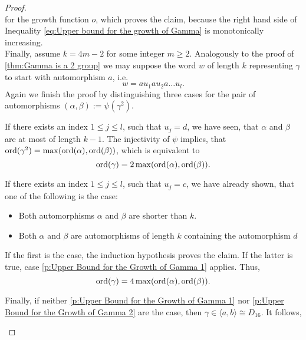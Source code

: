 \begin{proof}
\begin{equation}
\end{equation}
for the growth function $o$, which proves the claim, because the right hand side of Inequality \ref{eq:Upper bound for the growth of Gamma} is monotonically increasing.\\
Finally, assume $k=4m-2$ for some integer $m\geq 2$. Analogously to the proof of  \cref{thm:Gamma is a 2 group} we may suppose the word $w$ of length $k$ representing $\gamma$ to start with automorphism $a$, i.e.
\begin{equation*}
w=au_1 a u_2 a\ldots u_l.
\end{equation*}
Again we finish the proof by distinguishing three cases for the pair of automorphisms $(\alpha,\beta):=\psi(\gamma^2)$.
\begin{clist}
\item\label{p:Upper Bound for the Growth of Gamma 1} If there exists an index $1\leq j\leq l$, such that $u_j=d$, we have seen, that $\alpha$ and $\beta$ are at most of length $k-1$. The injectivity of $\psi$ implies, that $\operatorname{\mathrm{ord}}(\gamma^2)=\max(\operatorname{\mathrm{ord}}(\alpha),\operatorname{\mathrm{ord}}(\beta))$, which is equivalent to
\begin{equation}\label{eq:Upper Bound for the Growth of Gamma 1}
\operatorname{\mathrm{ord}}(\gamma)=2\max(\operatorname{\mathrm{ord}}(\alpha), \operatorname{\mathrm{ord}}(\beta)).
\end{equation}
\item\label{p:Upper Bound for the Growth of Gamma 2} If there exists an index $1\leq j\leq l$, such that $u_j=c$, we have already shown, that one of the following is the case:
\begin{itemize}
\item Both automorphisms $\alpha$ and $\beta$ are shorter than $k$.
\item Both $\alpha$ and $\beta$ are automorphisms of length $k$ containing the automorphism $d$
\end{itemize}
If the first is the case, the induction hypothesis proves the claim. If the latter is true, case \ref{p:Upper Bound for the Growth of Gamma 1} applies. Thus,
\begin{equation}\label{eq:Upper Bound for the Growth of Gamma 2}
\operatorname{\mathrm{ord}}(\gamma)=4\max(\operatorname{\mathrm{ord}}(\alpha), \operatorname{\mathrm{ord}}(\beta)).
\end{equation}
\item Finally, if neither \ref{p:Upper Bound for the Growth of Gamma 1} nor \ref{p:Upper Bound for the Growth of Gamma 2} are the case, then $\gamma\in\langle a,b\rangle\cong D_{16}$. It follows,
\begin{equation}\label{eq:Upper Bound for the Growth of Gamma 3}

\end{equation}
\end{clist}
\end{proof}
